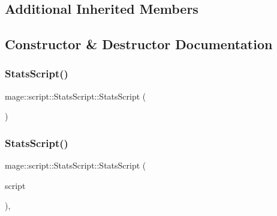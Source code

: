 \subsection*{Additional Inherited Members}


\subsection{Constructor \& Destructor Documentation}
\hypertarget{classmage_1_1script_1_1_stats_script_a6863940cb48633fbd5fc56547dc72a76}{}\label{classmage_1_1script_1_1_stats_script_a6863940cb48633fbd5fc56547dc72a76} 
\subsubsection{\texorpdfstring{Stats\+Script()}{StatsScript()}\hspace{0.1cm}{\footnotesize\ttfamily [1/3]}}
{\footnotesize\ttfamily mage\+::script\+::\+Stats\+Script\+::\+Stats\+Script (\begin{DoxyParamCaption}{ }\end{DoxyParamCaption})}

\hypertarget{classmage_1_1script_1_1_stats_script_a3fb4aa69fc341df0fe2c2ad03f0ff278}{}\label{classmage_1_1script_1_1_stats_script_a3fb4aa69fc341df0fe2c2ad03f0ff278} 
\subsubsection{\texorpdfstring{Stats\+Script()}{StatsScript()}\hspace{0.1cm}{\footnotesize\ttfamily [2/3]}}
{\footnotesize\ttfamily mage\+::script\+::\+Stats\+Script\+::\+Stats\+Script (\begin{DoxyParamCaption}\item[{const \hyperlink{classmage_1_1script_1_1_stats_script}{Stats\+Script} \&}]{script }\end{DoxyParamCaption})\hspace{0.3cm}{\ttfamily [default]}, {\ttfamily [noexcept]}}

\hypertarget{classmage_1_1script_1_1_stats_script_a9ac8ca59744a668504010b0f496f266f}{}\label{classmage_1_1script_1_1_stats_script_a9ac8ca59744a668504010b0f496f266f} 

